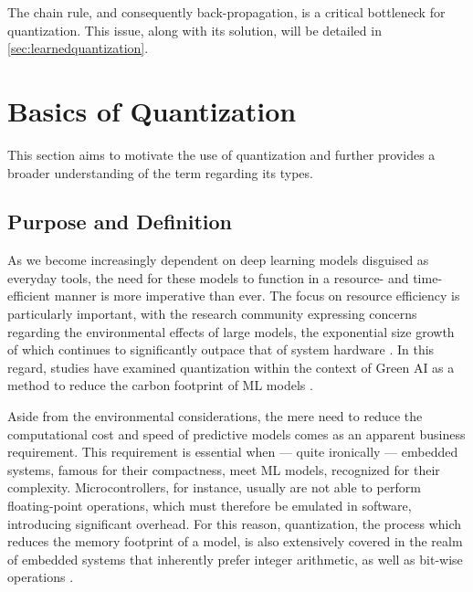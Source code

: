 The chain rule, and consequently back-propagation, is a critical bottleneck for quantization. 
This issue, along with its solution, will be detailed in \cref{sec:learnedquantization}.


\section{Basics of Quantization}
\label{sec:basicsofquantization}
\hspace*{1em}This section aims to motivate the use of quantization  
and further provides a broader understanding of the term regarding its types.


\subsection{Purpose and Definition}
\label{subsec:purposeanddefinition}
\hspace*{1em}As we become increasingly dependent on deep learning models disguised as everyday tools, 
the need for these models to function in a resource- and time-efficient manner is more imperative than ever. 
The focus on resource efficiency is particularly important, 
with the research community expressing concerns regarding the environmental effects of large models, 
the exponential size growth of which continues to significantly outpace that of system hardware \cite{DBLP:journals/corr/abs-2111-00364}. 
In this regard, studies have examined quantization within the context of Green AI as a method to reduce the carbon footprint of
ML models \cite{DBLP:journals/csi/RegueroMV25}.

Aside from the environmental considerations, the mere need to reduce 
the computational cost and speed of predictive models
comes as an apparent business requirement. 
This requirement is essential when — quite ironically — embedded systems, famous for their compactness, meet 
ML models, recognized for their complexity. Microcontrollers, for instance, 
usually are not able to perform floating-point operations, which must therefore be emulated in software, 
introducing significant overhead. 
For this reason, quantization,
the process which reduces the memory footprint of a model,
is also extensively covered in the realm of embedded systems that 
inherently prefer integer arithmetic, as well as bit-wise operations \cite{rastegari2016xnor, DBLP:conf/eccv/ZhangYYH18, DBLP:conf/codit/KhalifaM24, DBLP:journals/corr/abs-2105-13331}.

